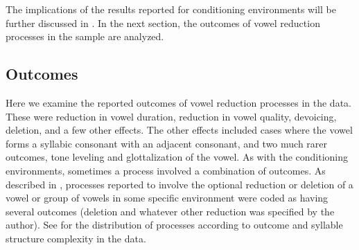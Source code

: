   The implications of the results reported for conditioning environments will be further discussed in . In the next section, the outcomes of vowel reduction processes in the sample are analyzed.

\subsection{Outcomes}\label{sec:6.3.5}

  Here we examine the reported outcomes of vowel reduction processes in the data. These were reduction in vowel duration, reduction in vowel quality, devoicing, deletion, and a few other effects. The other effects included cases where the vowel forms a syllabic consonant with an adjacent consonant, and two much rarer outcomes, tone leveling and glottalization of the vowel. As with the conditioning environments, sometimes a process involved a combination of outcomes. As described in , processes reported to involve the optional reduction or deletion of a vowel or group of vowels in some specific environment were coded as having several outcomes (deletion and whatever other reduction was specified by the author). See  for the distribution of processes according to outcome and syllable structure complexity in the data.

